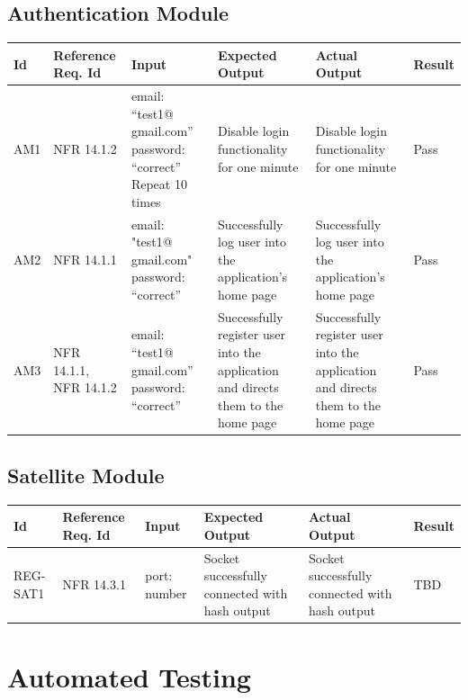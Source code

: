 \documentclass[12pt, titlepage]{article}
\begin{document}
\subsection{Authentication Module}

\begin{center}
\begin{tabular}{|p{1cm} | p{2cm} |p{2cm}| p{2cm} |p{2cm}| p{2cm}|}
\hline
\textbf{Id} & \textbf{Reference Req. Id} & \textbf{Input} & \textbf{Expected Output} & \textbf{Actual Output} & \textbf{Result} \\
\hline
AM1 & NFR 14.1.2 & {email: “test1@ gmail.com”
password: “correct” } Repeat 10 times
 & Disable login functionality for one minute
 & Disable login functionality for one minute & Pass
\\
\hline
AM2 & NFR 14.1.1 & { email: "test1@ gmail.com"
password: “correct” }
 & Successfully log user into the application’s home page
 & Successfully log user into the application’s home page & Pass
\\
\hline
AM3 & NFR 14.1.1, NFR 14.1.2 & { email: “test1@ gmail.com”
password: “correct” }
 & Successfully register user into the application and directs them to the home page
 & Successfully register user into the application and directs them to the home page & Pass
\\
\hline

\end{tabular}

\end{center}

\subsection{Satellite Module}
\begin{center}
\begin{tabular}{|p{1cm} | p{2cm} |p{2cm}| p{2cm} |p{2cm}| p{2cm}|}
\hline
\textbf{Id} & \textbf{Reference Req. Id} & \textbf{Input} & \textbf{Expected Output} & \textbf{Actual Output} & \textbf{Result} \\
\hline
REG-SAT1 & NFR 14.3.1 & { port: number }
 & Socket successfully connected with hash output
 & Socket successfully connected with hash output & TBD
\\
\hline

\end{tabular}

\end{center}

\section{Automated Testing}
		
\end{document}

